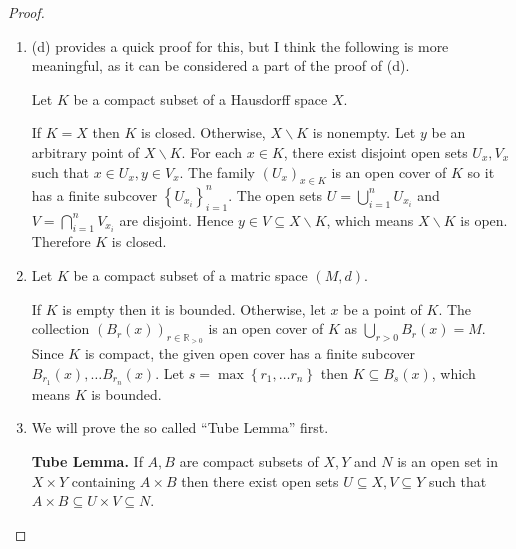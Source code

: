 \begin{proof}
\begin{enumerate}[itemsep=0pt,label={(\alph*)}]
              Let \( {(U_{\alpha})}_{\alpha\in A} \) be an open cover of \( S \), then \( {(U_{\alpha})}_{\alpha\in A} \) together with \( X \smallsetminus S \) is an open cover of \( X \). Since \( X \) is compact, this open cover has a finite subcover. This finite subcover together with \( X \smallsetminus S \) is still a finite subcover of \( X \). Let the members of the subcover be \( U_{\alpha_{1}}, \ldots, U_{\alpha_{n}}, X \smallsetminus S \) then \( \bigcup_{i=1}^{n} U_{\alpha_{i}} \) covers \( S \), which means the open cover \( {(U_{\alpha})}_{\alpha\in A} \) of \( S \) has a finite subcover. Hence \( S \) is compact.
        \item (d) provides a quick proof for this, but I think the following is more meaningful, as it can be considered a part of the proof of (d).

              Let \( K \) be a compact subset of a Hausdorff space \( X \).

              If \( K = X \) then \( K \) is closed. Otherwise, \( X \smallsetminus K \) is nonempty. Let \( y \) be an arbitrary point of \( X \smallsetminus K \). For each \( x \in K \), there exist disjoint open sets \( U_{x}, V_{x} \) such that \( x \in U_{x}, y \in V_{x} \). The family \( {(U_{x})}_{x\in K} \) is an open cover of \( K \) so it has a finite subcover \( {\left\{ U_{x_{i}} \right\}}_{i=1}^{n} \). The open sets \( U = \bigcup_{i=1}^{n} U_{x_{i}} \) and \( V = \bigcap_{i=1}^{n} V_{x_{i}} \) are disjoint. Hence \( y \in V \subseteq X \smallsetminus K \), which means \( X \smallsetminus K \) is open. Therefore \( K \) is closed.
        \item Let \( K \) be a compact subset of a matric space \( (M, d) \).

              If \( K \) is empty then it is bounded. Otherwise, let \( x \) be a point of \( K \). The collection \( {(B_{r}(x))}_{r \in \mathbb{R}_{> 0}} \) is an open cover of \( K \) as \( \bigcup_{r > 0} B_{r}(x) = M \). Since \( K \) is compact, the given open cover has a finite subcover \( B_{r_{1}}(x), \ldots B_{r_{n}}(x) \). Let \( s = \max\left\{ r_{1}, \ldots r_{n} \right\} \) then \( K \subseteq B_{s}(x) \), which means \( K \) is bounded.
        \item We will prove the so called ``Tube Lemma'' first.

              \textbf{Tube Lemma.} If \( A, B \) are compact subsets of \( X, Y \) and \( N \) is an open set in \( X \times Y \) containing \( A \times B \) then there exist open sets \( U \subseteq X, V \subseteq Y \) such that \( A \times B \subseteq U \times V \subseteq N \).


\end{enumerate}
\end{proof}
